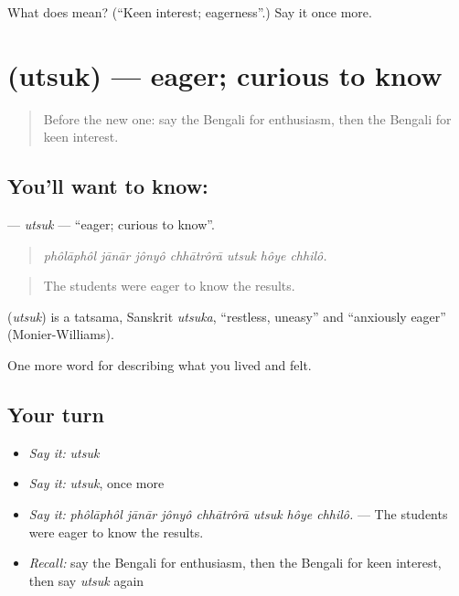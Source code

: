 \begin{tcolorbox}[breakable,colback=teal!4,colframe=teal!35!black,title={Before you move on}]
What does  mean? (\textquotedblleft{}Keen interest; eagerness\textquotedblright{}.) Say it once more.
\end{tcolorbox}
\section[\texorpdfstring{\bn{উৎসুক} (utsuk)}{উৎসুক (utsuk)}]{ (utsuk) — eager; curious to know}

\label{lesson:BN-C455-utsuk}



\begin{quote}
Before the new one: say the Bengali for enthusiasm, then the Bengali for keen interest.
\end{quote}

\subsection*{You'll want to know: }
\textbf{} — \emph{utsuk} — \textquotedblleft{}eager; curious to know\textquotedblright{}.

\begin{quote}
      
\end{quote}

\begin{quote}
\emph{phôlāphôl jānār jônyô chhātrôrā utsuk hôye chhilô.}
\end{quote}

\begin{quote}
The students were eager to know the results.
\end{quote}

\begin{cousinweb}
\textbf{} (\emph{utsuk}) is a tatsama, Sanskrit \emph{utsuka}, \textquotedblleft{}restless, uneasy\textquotedblright{} and \textquotedblleft{}anxiously eager\textquotedblright{} (Monier-Williams).
\end{cousinweb}

\begin{grammarlens}[title={What you've built}]
One more word for describing what you lived and felt.
\end{grammarlens}

\subsection*{Your turn}
\begin{itemize}
\raggedright
  \item \emph{Say it:} \emph{utsuk}
  \item \emph{Say it:} \emph{utsuk}, once more
  \item \emph{Say it:} \emph{phôlāphôl jānār jônyô chhātrôrā utsuk hôye chhilô.} — The students were eager to know the results.
  \item \emph{Recall:} say the Bengali for enthusiasm, then the Bengali for keen interest, then say \emph{utsuk} again
\end{itemize}

